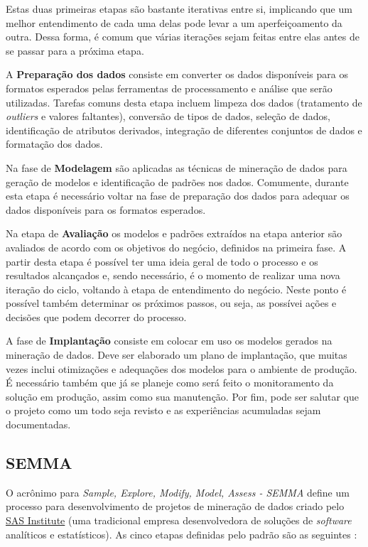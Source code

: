 \documentclass[
	article,			%
	11pt,				%
	oneside,			%
	a4paper,			%
	english,			%
	brazil,				%
	sumario=tradicional
	]{abntex2}
\begin{document}
Estas duas primeiras etapas são bastante iterativas entre si, implicando que
um melhor entendimento de cada uma delas pode levar a um aperfeiçoamento da
outra. Dessa forma, é comum que várias iterações sejam feitas entre elas antes
de se passar para a próxima etapa.

A \textbf{Preparação dos dados} consiste em converter os dados disponíveis para
os formatos esperados pelas ferramentas de processamento e análise que serão
utilizadas. Tarefas comuns desta etapa incluem limpeza dos dados (tratamento de
\textit{outliers} e valores faltantes), conversão de tipos de dados, seleção de
dados, identificação de atributos derivados, integração de diferentes conjuntos
de dados e formatação dos dados.

Na fase de \textbf{Modelagem} são aplicadas as técnicas de mineração de dados
para geração de modelos e identificação de padrões nos dados. Comumente, durante
esta etapa é necessário voltar na fase de preparação dos dados para adequar os
dados disponíveis para os formatos esperados.

Na etapa de \textbf{Avaliação} os modelos e padrões extraídos na etapa anterior
são avaliados de acordo com os objetivos do negócio, definidos na primeira fase.
A partir desta etapa é possível ter uma ideia geral de todo o processo e os
resultados alcançados e, sendo necessário, é o momento de realizar uma nova
iteração do ciclo, voltando à etapa de entendimento do negócio. Neste ponto é
possível também determinar os próximos passos, ou seja, as possívei ações e
decisões que podem decorrer do processo.

A fase de \textbf{Implantação} consiste em colocar em uso os modelos gerados
na mineração de dados. Deve ser elaborado um plano de implantação, que muitas
vezes inclui otimizações e adequações dos modelos para o ambiente de produção.
É necessário também que já se planeje como será feito o monitoramento da solução
em produção, assim como sua manutenção. Por fim, pode ser salutar que o projeto
como um todo seja revisto e as experiências acumuladas sejam documentadas.

\subsection{SEMMA}

O acrônimo para \textit{Sample, Explore, Modify, Model, Assess - SEMMA} define
um processo para desenvolvimento de projetos de mineração de dados criado pelo
\href{https://www.sas.com}{SAS Institute} (uma tradicional empresa
desenvolvedora de soluções de \textit{software} analíticos e estatísticos). As
cinco etapas definidas pelo padrão são as seguintes
\cite{wikipedia-semma-2021,azevedo2008}:
\end{document}
